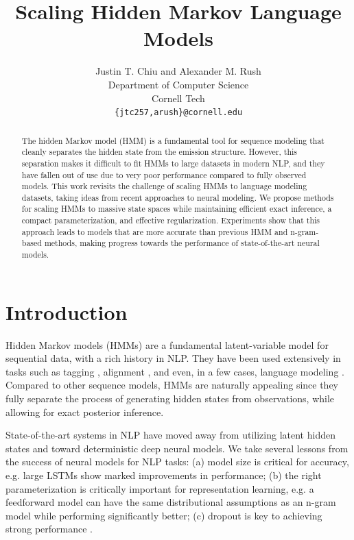 \documentclass[11pt,a4paper]{article}
\title{Scaling Hidden Markov Language Models}
\author{Justin T. Chiu {\normalfont and} Alexander M. Rush\\
  Department of Computer Science \\
  Cornell Tech \\
  \texttt{\{jtc257,arush\}@cornell.edu}\\}
\date{}
\begin{document}
\maketitle
\begin{abstract}
The hidden Markov model (HMM) is a fundamental tool for sequence modeling that 
cleanly separates the hidden state from the emission structure.
However, this separation makes it difficult to fit HMMs to large datasets in modern NLP, 
and they have fallen out of use due to very poor performance 
compared to fully observed models. This work revisits the challenge of 
scaling HMMs to language modeling datasets,
taking ideas from recent approaches to neural modeling.
We propose methods for scaling HMMs to massive state spaces
while maintaining efficient exact inference, a compact parameterization,
and effective regularization.
Experiments show that this approach leads to models that are more accurate
than previous HMM and n-gram-based methods,
making progress towards the performance of state-of-the-art neural models.
\end{abstract}

\section{Introduction}

Hidden Markov models (HMMs) are a fundamental latent-variable model for sequential data,
with a rich history in NLP.
They have been used extensively in tasks such as
tagging \citep{merialdo1994tagging}, alignment \citep{vogel1996hmm},
and even, in a few cases, language modeling \citep{kuhn1994hmmlm,huang2011thesis}. 
Compared to other sequence models, HMMs are naturally appealing since they 
fully separate the process of generating hidden states from observations,
while allowing for exact posterior inference. 

State-of-the-art systems in NLP have moved away from utilizing latent hidden states
and toward deterministic deep neural models.
We take several lessons from the success of neural models for NLP tasks:
(a) model size is critical for accuracy,
e.g. large LSTMs \cite{zaremba2014lstm} show marked improvements in performance;
(b) the right parameterization is critically important for representation learning,
e.g. a feedforward model \cite{bengio2003nlm}
can have the same distributional assumptions as an n-gram model while performing significantly better;
(c) dropout is key to achieving strong performance \citep{zaremba2014lstm,merity2017awdlstm}.
\end{document}
